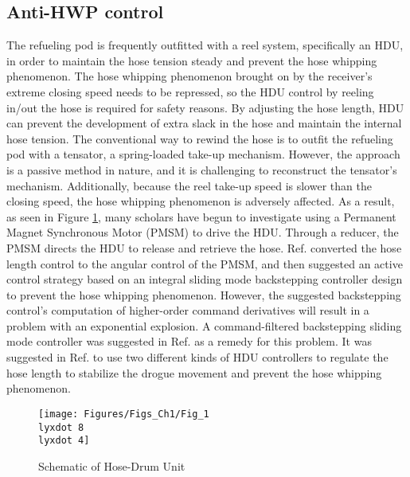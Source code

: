 \subsection{Anti-HWP control}

The refueling pod is frequently outfitted with a reel system, specifically
an HDU\cite{vassberg2003numerical}, in order to maintain the hose
tension steady and prevent the hose whipping phenomenon\cite{ro2011dynamics}.
The hose whipping phenomenon brought on by the receiver's extreme
closing speed needs to be repressed, so the HDU control by reeling
in/out the hose is required for safety reasons. By adjusting the hose
length, HDU can prevent the development of extra slack in the hose
and maintain the internal hose tension. The conventional way to rewind
the hose is to outfit the refueling pod with a tensator, a spring-loaded
take-up mechanism. However, the approach is a passive method in nature,
and it is challenging to reconstruct the tensator's mechanism. Additionally,
because the reel take-up speed is slower than the closing speed, the
hose whipping phenomenon is adversely affected. As a result, as seen
in Figure \ref{Fig_1.8-4}, many scholars have begun to investigate
using a Permanent Magnet Synchronous Motor (PMSM) to drive the HDU.
Through a reducer, the PMSM directs the HDU to release and retrieve
the hose. Ref.\cite{wang2014dynamic} converted the hose length control
to the angular control of the PMSM, and then suggested an active control
strategy based on an integral sliding mode backstepping controller
design to prevent the hose whipping phenomenon. However, the suggested
backstepping control's computation of higher-order command derivatives
will result in a problem with an exponential explosion. A command-filtered
backstepping sliding mode controller was suggested in Ref.\cite{he2017command}
as a remedy for this problem. It was suggested in Ref.\cite{dai2019hose}
to use two different kinds of HDU controllers to regulate the hose
length to stabilize the drogue movement and prevent the hose whipping
phenomenon.

\begin{figure}
\begin{centering}
\texttt{[image: Figures/Figs\_Ch1/Fig\_1\\lyxdot 8\\lyxdot 4]}
\par\end{centering}
\caption{Schematic of Hose-Drum Unit\cite{wang2014dynamic}}

\centering{}\label{Fig_1.8-4}
\end{figure}



